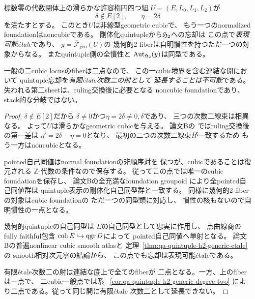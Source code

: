\begin{corollary}
\label{cor:qa-ou-one-cubic-fiber-and-nonfiniteness}
標数零の代数閉体上の滑らかな許容楕円四つ組
$U=(E,L_0,L_1,L_2)$が
\[
 \delta\notin E[2],\qquad \eta=2\delta
 \tag{one-cubic}\label{eq:qa-ou-one-cubic-divisor}
\]
を満たすとする。
このとき$U$は非線型geometric cubicで、
もう一つのnormalized foundationはnoncubicである。
剛体化quintupleから$\mathfrak H_2$への忘却は
この点で\emph{表現可能étale}であり、
$y=\overline{\mathcal F}_{\mathrm{geo}}(U)$の
幾何的2-fiberは自明慣性を持つただ一つの対象からなる。
またquintuple側の全慣性と
$\operatorname{Aut}_{\mathfrak H_2}(y)$は同型である。

一般の二cubic locusのfiberは二点なので、
この一cubic境界を含む連結な開において
quintuple忘却を\emph{有限étale次数二の射として
延長することは不可能}である。
失われる第二sheetは、ruling交換後に必要となる
noncubic foundationであり、stack的な分岐ではない。
\end{corollary}
\begin{proof}
$\delta\notin E[2]$だから
$\delta\ne0$かつ$\eta=2\delta\ne0,\delta$であり、
三つの次数二線束は相異なる。
よって$U$は滑らかなgeometric cubicを与える。
論文Bの
\cite[\texttt{lem:elliptic-two-reflections},
\texttt{cor:two-intrinsic-foundations}]{QuadricModuli2026}
ではruling交換後の第一差は
$\eta'=2\delta-\eta=0$となり、
最初の二つの次数二線束が一致するため
もう一方はnoncubicとなる。

pointed自己同値はnormal foundationの非順序対を
保つが、cubicであることは復元される
$\mathbb Z$-代数の条件なので保存する。
従ってこの点では唯一のcubic foundationを保存し、
論文Bの全充満なfoundation groupoid
\cite[\texttt{cor:h2-point-groupoid-foundation}]{QuadricModuli2026}
により全pointed自己同値群は
quintuple表示の剛体化自己同型群と一致する。
同様に幾何的2-fiberの対象はcubic foundationの
ただ一つの同型類に対応し、
慣性の核もないので自明慣性の一点となる。

幾何的quintupleの自己同型は
$E$の自己同型として忠実に作用し、
点曲線商のfully faithful包含
$\operatorname{coh} E\hookrightarrow\operatorname{qgr} D$によって
pointed自己同値へ単射となる。
論文Bの普遍nonlinear cubic smooth atlasと
定理~\ref{thm:qa-quintuple-h2-generic-etale}の
smooth相対次元零の結論から、
この点でも忘却は表現可能étaleである。

有限étale次数二の射は連結な底上で全てのfiberが
二点となる。一方、上のfiberは一点で、
二cubic一般点では系
~\ref{cor:qa-quintuple-h2-generic-degree-two}
により二点である。従って同じ開に有限étale
次数二として延長できない。
\end{proof}

